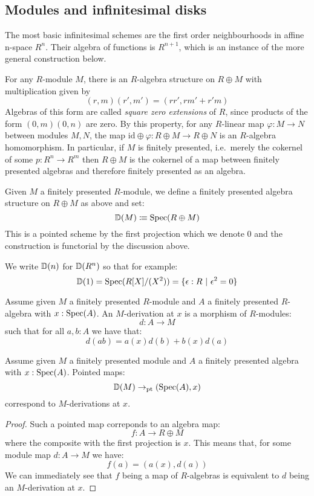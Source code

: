 
\subsection{Modules and infinitesimal disks}
The most basic infinitesimal schemes are the first order neighbourhoods in affine n-space $R^n$. Their algebra of functions is $R^{n+1}$, which is an instance of the more general construction below.

For any $R$-module $M$, there is an $R$-algebra structure on $R\oplus M$ with multiplication given by
\[(r,m)(r',m') = (rr',rm'+r'm)\]
Algebras of this form are called \emph{square zero extensions} of $R$, since products of the form $(0,m)(0,n)$ are zero.
By this property, for any $R$-linear map $\varphi:M\to N$ between modules $M,N$, the map $\mathrm{id}\oplus \varphi: R\oplus M\to R\oplus N$ is an $R$-algebra homomorphism. In particular, if $M$ is finitely presented, i.e.\ merely the cokernel of some $p:R^n\to R^m$ then $R\oplus M$ is the cokernel of a map between finitely presented algebras and therefore finitely presented as an algebra. 

\begin{definition}
Given $M$ a finitely presented $R$-module, we define a finitely presented algebra structure on $R\oplus M$ as above and set:
\[\mathbb{D}(M)\vcentcolon\mspace{-1.2mu}\equiv \operatorname{Spec}(R\oplus M)\]
This is a pointed scheme by the first projection which we denote $0$
and the construction is functorial by the discussion above.
\end{definition}

We write $\mathbb{D}(n)$ for $\mathbb{D}(R^n)$ so that for example:
\[\D(1) = \Spec(R[X]/(X^2)) = \{\epsilon:R\ |\ \epsilon^2=0\}\]

\begin{definition}\label{derivation-pointwise}
Assume given $M$ a finitely presented $R$-module and $A$ a finitely presented $R$-algebra with $x:\operatorname{Spec}(A)$. An $M$-derivation at $x$ is a morphism of $R$-modules:
\[d:A\to M\]
such that for all $a,b:A$ we have that:
\[d(ab) = a(x)d(b) + b(x)d(a)\]
\end{definition}

\begin{lemma}\label{tangent-are-derivation}
Assume given $M$ a finitely presented module and $A$ a finitely presented algebra with $x:\operatorname{Spec}(A)$. Pointed maps:
\[\mathbb{D}(M)\to_{\mathrm{pt}} (\operatorname{Spec}(A),x)\] 
correspond to $M$-derivations at $x$.
\end{lemma}

\begin{proof}
Such a pointed map correponds to an algebra map:
\[f : A\to R\oplus M\]
where the composite with the first projection is $x$. This means that, for some module map $d:A\to M$ we have:
\[f(a) = (a(x),d(a))\]
We can immediately see that $f$ being a map of $R$-algebras is equivalent to $d$ being an $M$-derivation at $x$.
\end{proof}

